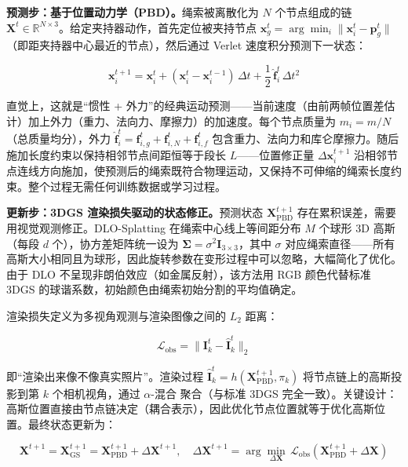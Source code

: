 \textbf{预测步：基于位置动力学（PBD）。}绳索被离散化为 $N$ 个节点组成的链 $\mathbf{X}^t \in \mathbb{R}^{N \times 3}$。给定夹持器动作，首先定位被夹持节点 $\mathbf{x}_g^t = \arg\min_i \|\mathbf{x}_i^t - \mathbf{p}_g^t\|$（即距夹持器中心最近的节点），然后通过 Verlet 速度积分预测下一状态：

\begin{equation}
    \mathbf{x}_i^{t+1} = \mathbf{x}_i^t + (\mathbf{x}_i^t - \mathbf{x}_i^{t-1})\,\Delta t + \frac{1}{2}\,\hat{\mathbf{f}}_i^t\,\Delta t^2
\end{equation}

直觉上，这就是``惯性 + 外力''的经典运动预测——当前速度（由前两帧位置差估计）加上外力（重力、法向力、摩擦力）的加速度。每个节点质量为 $m_i = m / N$（总质量均分），外力 $\hat{\mathbf{f}}_i^t = \mathbf{f}_{i,g}^t + \mathbf{f}_{i,N}^t + \mathbf{f}_{i,f}^t$ 包含重力、法向力和库仑摩擦力。随后施加长度约束以保持相邻节点间距恒等于段长 $L$——位置修正量 $\Delta\mathbf{x}_i^{t+1}$ 沿相邻节点连线方向施加，使预测后的绳索既符合物理运动，又保持不可伸缩的绳索长度约束。整个过程无需任何训练数据或学习过程。

\textbf{更新步：3DGS 渲染损失驱动的状态修正。}预测状态 $\mathbf{X}_{\text{PBD}}^{t+1}$ 存在累积误差，需要用视觉观测修正。DLO-Splatting 在绳索中心线上等间距分布 $M$ 个球形 3D 高斯（每段 $d$ 个），协方差矩阵统一设为 $\boldsymbol{\Sigma} = \sigma^2 \mathbf{I}_{3 \times 3}$，其中 $\sigma$ 对应绳索直径——所有高斯大小相同且为球形，因此旋转参数在变形过程中可以忽略，大幅简化了优化。由于 DLO 不呈现非朗伯效应（如金属反射），该方法用 RGB 颜色代替标准 3DGS 的球谐系数，初始颜色由绳索初始分割的平均值确定。

渲染损失定义为多视角观测与渲染图像之间的 $L_2$ 距离：

\begin{equation}
    \mathcal{L}_{\text{obs}} = \|\mathbf{I}_k^t - \hat{\mathbf{I}}_k^t\|_2
\end{equation}

即``渲染出来像不像真实照片''。渲染过程 $\hat{\mathbf{I}}_k^t = h(\mathbf{X}_{\text{PBD}}^{t+1}, \pi_k)$ 将节点链上的高斯投影到第 $k$ 个相机视角，通过 $\alpha$-混合 聚合（与标准 3DGS 完全一致）。关键设计：高斯位置直接由节点链决定（耦合表示），因此优化节点位置就等于优化高斯位置。最终状态更新为：

\begin{equation}
    \mathbf{X}^{t+1} = \mathbf{X}_{\text{GS}}^{t+1} = \mathbf{X}_{\text{PBD}}^{t+1} + \Delta\mathbf{X}^{t+1}, \quad \Delta\mathbf{X}^{t+1} = \arg\min_{\Delta\mathbf{X}}\,\mathcal{L}_{\text{obs}}(\mathbf{X}_{\text{PBD}}^{t+1} + \Delta\mathbf{X})
\end{equation}

